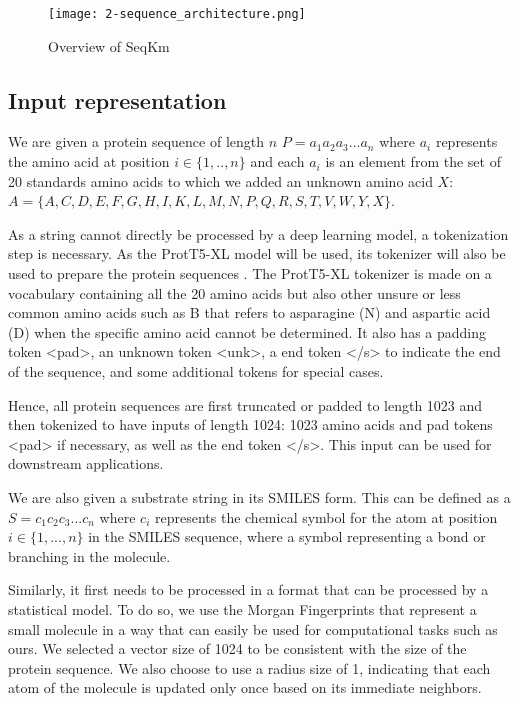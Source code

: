 \begin{figure}
  \centering
  \texttt{[image: 2-sequence\_architecture.png]}
  \caption{Overview of SeqKm}
  \label{fig:seqkm}
\end{figure}

\subsection{Input representation}

We are given a protein sequence of length $n$ $P=a_1a_2a_3...a_n$ where $a_i$ represents the amino acid
at position $i\in\{1,..,n\}$ and each $a_i$ is an element from the set of 20 standards amino acids to
which we added an unknown amino acid $X$: $A=\{A,C,D,E,F,G,H,I,K,L,M,N,P,Q,R,S,T,V,W,Y,X\}$.

As a string cannot directly be processed by a deep learning model, a tokenization step is necessary. As
the ProtT5-XL model will be used, its tokenizer will also be used to prepare the protein sequences \cite{prottrans}.
The ProtT5-XL tokenizer is made on a vocabulary containing all the 20 amino acids but also other unsure or less
common amino acids such as B that refers to asparagine (N) and aspartic acid (D) when the specific
amino acid cannot be determined. It also has a padding token <pad>, an unknown token <unk>, a end
token </s> to indicate the end of the sequence, and some additional tokens for special cases.

Hence, all protein sequences are first truncated or padded to length 1023 and then tokenized to have inputs of
length 1024: 1023 amino acids and pad tokens <pad> if necessary, as well as the end token </s>. This input can be used for downstream
applications.

We are also given a substrate string in its SMILES form. This can be defined as a $S=c_1c_2c_3...c_n$
where $c_i$ represents the chemical symbol for the atom at position $i\in\{1,...,n\}$ in the SMILES
sequence, where a symbol representing a bond or branching in the molecule.

Similarly, it first needs to be processed in a format that can be processed by a statistical model. To do so,
we use the Morgan Fingerprints that represent a small molecule in a way that can easily be used for computational
tasks such as ours. \cite{Capecchi2020} We selected a vector size of 1024 to be consistent with the size of the protein sequence. We
also choose to use a radius size of 1, indicating that each atom of the molecule is updated only once based on its
immediate neighbors.


